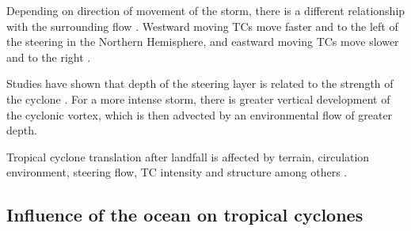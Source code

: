 Depending on direction of movement of the storm, there is a different relationship with the surrounding flow \citep{chan1985identification}. Westward moving TCs move faster and to the left of the steering in the Northern Hemisphere, and eastward moving TCs move slower and to the right \citep{carr1990observational}.


Studies have shown that depth of the steering layer is related to the strength of the cyclone \citep{velden1991basic}. For a more intense storm, there is greater vertical development of the cyclonic vortex, which is then advected by an environmental flow of greater depth. 

Tropical cyclone translation after landfall is affected by terrain, circulation environment, steering flow, TC intensity and structure among others \citep{xiao2013analysis}.







\subsection{Influence of the ocean on tropical cyclones} \label{ocean}

